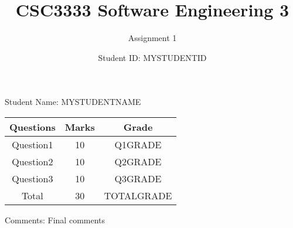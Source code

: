 \documentclass{article}
\title{CSC3333 Software Engineering 3}
\author{Assignment 1 }
\date{Student ID: MYSTUDENTID}
\begin{document}
\maketitle
    \begin{center}Student Name: MYSTUDENTNAME\end{center}
\begin{center}
\begin{tabular}{ |c|c|c|}
\hline
Questions & Marks & Grade\\
\hline
Question1 & 10 & Q1GRADE\\
\hline
Question2 & 10 & Q2GRADE\\
\hline
Question3 & 10 & Q3GRADE\\
\hline
Total & 30 & TOTALGRADE\\
\hline
\end{tabular}
\end{center}
Comments: Final comments
\end{document}
